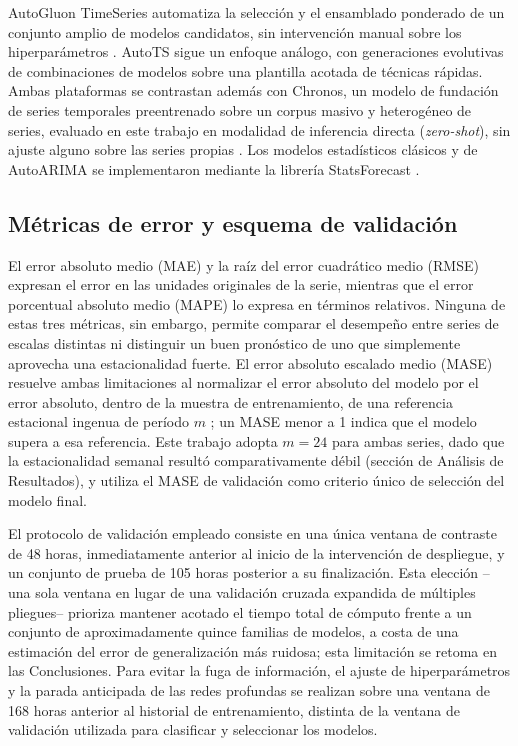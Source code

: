 AutoGluon TimeSeries automatiza la selección y el ensamblado ponderado de un conjunto amplio de modelos
candidatos, sin intervención manual sobre los hiperparámetros \parencite{shchur2023autogluon}. AutoTS sigue
un enfoque análogo, con generaciones evolutivas de combinaciones de modelos sobre una plantilla acotada de
técnicas rápidas. Ambas plataformas se contrastan además con Chronos, un modelo de fundación de series
temporales preentrenado sobre un corpus masivo y heterogéneo de series, evaluado en este trabajo en
modalidad de inferencia directa (\emph{zero-shot}), sin ajuste alguno sobre las series propias
\parencite{ansari2024chronos}. Los modelos estadísticos clásicos y de AutoARIMA se implementaron mediante
la librería StatsForecast \parencite{garza2022statsforecast}.

\subsection{Métricas de error y esquema de validación}

El error absoluto medio (MAE) y la raíz del error cuadrático medio (RMSE) expresan el error en las
unidades originales de la serie, mientras que el error porcentual absoluto medio (MAPE) lo expresa en
términos relativos. Ninguna de estas tres métricas, sin embargo, permite comparar el desempeño entre series
de escalas distintas ni distinguir un buen pronóstico de uno que simplemente aprovecha una estacionalidad
fuerte. El error absoluto escalado medio (MASE) resuelve ambas limitaciones al normalizar el error absoluto
del modelo por el error absoluto, dentro de la muestra de entrenamiento, de una referencia estacional
ingenua de período $m$ \parencite{hyndman2006}; un MASE menor a 1 indica que el modelo supera a esa
referencia. Este trabajo adopta $m=24$ para ambas series, dado que la estacionalidad semanal resultó
comparativamente débil (sección de Análisis de Resultados), y utiliza el MASE de validación como criterio
único de selección del modelo final.

El protocolo de validación empleado consiste en una única ventana de contraste de 48 horas, inmediatamente
anterior al inicio de la intervención de despliegue, y un conjunto de prueba de 105 horas posterior a su
finalización. Esta elección --una sola ventana en lugar de una validación cruzada expandida de múltiples
pliegues-- prioriza mantener acotado el tiempo total de cómputo frente a un conjunto de aproximadamente
quince familias de modelos, a costa de una estimación del error de generalización más ruidosa; esta
limitación se retoma en las Conclusiones. Para evitar la fuga de información, el ajuste de hiperparámetros
y la parada anticipada de las redes profundas se realizan sobre una ventana de 168 horas anterior al
historial de entrenamiento, distinta de la ventana de validación utilizada para clasificar y seleccionar
los modelos.
